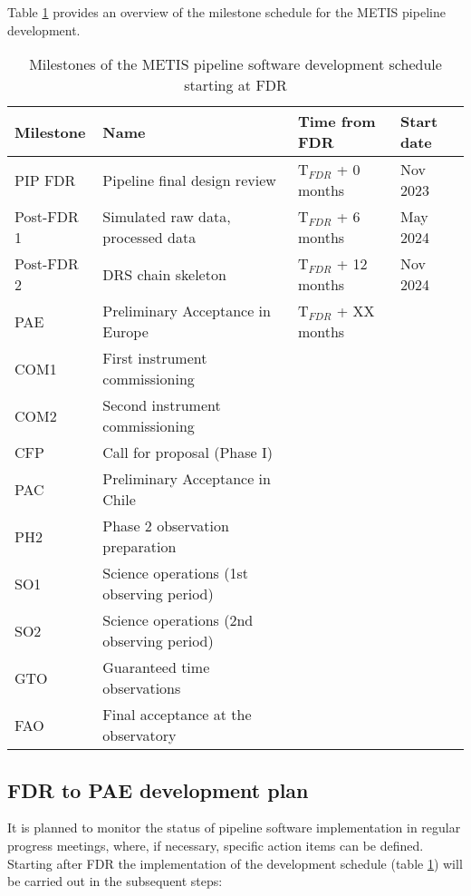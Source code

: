 Table \ref{tab:development_schedule} provides an overview of the milestone schedule for the METIS pipeline development.

\begin{table}
    \caption[Development schedule]{Milestones of the METIS pipeline software development schedule starting at FDR}
  \label{tab:development_schedule}
  \centering\scriptsize
  \begin{tabularx}{\textwidth}{llll}
    \hline
    Milestone & Name & Time from FDR & Start date \\
    \hline\hline
    PIP FDR          & Pipeline final design review & T$_ {FDR}$ + 0 months & Nov 2023 \\
    Post-FDR 1       & Simulated raw data, processed data &  T$_ {FDR}$ + 6 months & May 2024 \\
    Post-FDR 2       & DRS chain skeleton               &  T$_{FDR}$ + 12 months & Nov 2024 \\
    PAE              & Preliminary Acceptance in Europe &  T$_{FDR}$ + XX months &  \\
    COM1             & First instrument commissioning &  & \\
    COM2             & Second instrument commissioning &  & \\
    CFP              & Call for proposal (Phase I) &  & \\
    PAC              & Preliminary Acceptance in Chile &  & \\
    PH2              & Phase 2 observation preparation &  & \\
    SO1              & Science operations (1st observing period) &  & \\
    SO2              & Science operations (2nd observing period) &  & \\
    GTO              & Guaranteed time observations &  & \\
    FAO              & Final acceptance at the observatory & & \\
    \hline
  \end{tabularx}
\end{table}

\subsection{FDR to PAE development plan}
\label{ssec:fdr2pae}

It is planned to monitor the status of pipeline software implementation in regular progress meetings, where, if necessary, specific action items can be defined. Starting after FDR the implementation of the development schedule (table \ref{tab:development_schedule}) will be carried out in the subsequent steps:


